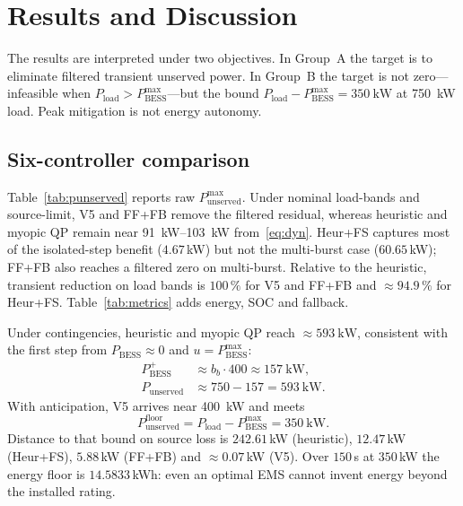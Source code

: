\documentclass{ieeeaccess}
\begin{document}
\section{Results and Discussion}
\label{sec:results}
\FloatBarrier

The results are interpreted under two objectives. In Group~A the target is to eliminate filtered transient unserved power. In Group~B the target is not zero---infeasible when $P_{\mathrm{load}}>P_{\mathrm{BESS}}^{\max}$---but the bound $P_{\mathrm{load}}-P_{\mathrm{BESS}}^{\max}=\SI{350}{\kilo\watt}$ at \SI{750}{\kilo\watt} load. Peak mitigation is not energy autonomy.

\subsection{Six-controller comparison}
\label{sec:maincmp}
Table~\ref{tab:punserved} reports raw $P_{\mathrm{unserved}}^{\max}$. Under nominal load-bands and source-limit, V5 and FF+FB remove the filtered residual, whereas heuristic and myopic QP remain near \SIrange{91}{103}{\kilo\watt} from~\eqref{eq:dyn}. Heur+FS captures most of the isolated-step benefit ($4.67$\,kW) but not the multi-burst case ($60.65$\,kW); FF+FB also reaches a filtered zero on multi-burst. Relative to the heuristic, transient reduction on load bands is $100\,\%$ for V5 and FF+FB and $\approx 94.9\,\%$ for Heur+FS. Table~\ref{tab:metrics} adds energy, SOC and fallback.

Under contingencies, heuristic and myopic QP reach $\approx\SI{593}{\kilo\watt}$, consistent with the first step from $P_{\mathrm{BESS}}\approx 0$ and $u=P_{\mathrm{BESS}}^{\max}$:
\begin{align}
P_{\mathrm{BESS}}^{+}
&\approx b_b\cdot 400
\approx\SI{157}{\kilo\watt},\\
P_{\mathrm{unserved}}
&\approx 750-157
=\SI{593}{\kilo\watt}.
\end{align}
With anticipation, V5 arrives near \SI{400}{\kilo\watt} and meets
\begin{equation}
P_{\mathrm{unserved}}^{\mathrm{floor}}=P_{\mathrm{load}}-P_{\mathrm{BESS}}^{\max}=\SI{350}{\kilo\watt}.
\end{equation}
Distance to that bound on source loss is $242.61$\,kW (heuristic), $12.47$\,kW (Heur+FS), $5.88$\,kW (FF+FB) and $\approx 0.07$\,kW (V5). Over $150$\,s at $350$\,kW the energy floor is $14.5833$\,kWh: even an optimal EMS cannot invent energy beyond the installed rating.
\end{document}
